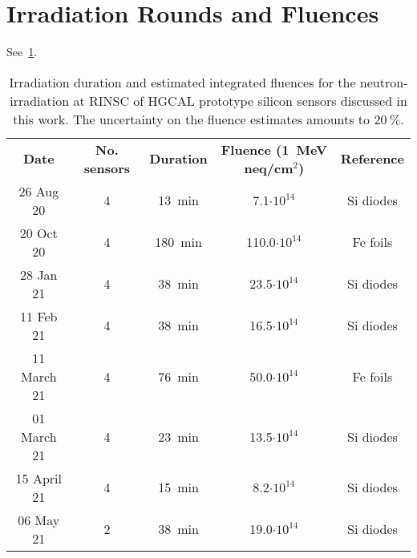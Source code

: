 \section{Irradiation Rounds and Fluences}
\label{appendix:irrad_rounds}
See~\ref{table:irrads}.
\begin{table}[h]
	\centering
	\begin{tabular}{c|cccc}
		\textbf{Date} & \textbf{No. sensors} & \textbf{Duration} & \textbf{Fluence (\SI{1}{\mega\eV} neq/cm$^2$)} & \textbf{Reference} \\
		26 Aug 20 & 4 & \SI{13}{\minute} & 7.1$\cdot 10^{14}$ & Si diodes \\
		20 Oct 20 & 4 & \SI{180}{\minute} & 110.0$\cdot 10^{14}$ & Fe foils \\
		28 Jan 21 & 4 & \SI{38}{\minute} & 23.5$\cdot 10^{14}$ & Si diodes \\
		11 Feb 21 & 4 & \SI{38}{\minute} & 16.5$\cdot 10^{14}$ & Si diodes \\
		11 March 21 & 4 & \SI{76}{\minute} & 50.0$\cdot 10^{14}$ & Fe foils \\
		01 March 21 & 4 & \SI{23}{\minute} & 13.5$\cdot 10^{14}$ & Si diodes \\
		15 April 21 & 4 & \SI{15}{\minute} & 8.2$\cdot 10^{14}$ & Si diodes \\
		06 May 21 & 2 & \SI{38}{\minute} & 19.0$\cdot 10^{14}$ & Si diodes \\
	\end{tabular}
	\caption{Irradiation duration and estimated integrated fluences for the neutron-irradiation at RINSC of HGCAL prototype silicon sensors discussed in this work.
	The uncertainty on the fluence estimates amounts to 20$~\%$.
	}
	\label{table:irrads}
\end{table}


